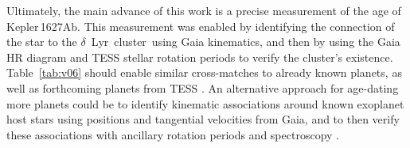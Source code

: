 \documentclass[12pt,modern,twocolumn,tighten]{aastex63}
\newcommand{\cn}{$\delta$\ Lyr\ cluster} %
\newcommand{\pn}{Kepler\,1627Ab} %
\begin{document}
Ultimately, the main advance of this work is a precise measurement of
the age of \pn.   This measurement was enabled by identifying the
connection of the star to the \cn\ using Gaia kinematics, and then by
using the Gaia HR diagram and TESS stellar rotation periods to verify the
cluster's existence.
Table~\ref{tab:v06} should enable similar cross-matches to already
known planets, as well as forthcoming planets from TESS
\citep{guerrero_tess_2021}.  An alternative
approach for age-dating more planets could be to identify kinematic
associations around known exoplanet host stars using positions and
tangential velocities from Gaia, and to then verify these associations
with ancillary rotation periods and spectroscopy \citep[{\it
e.g.},][]{tofflemire_tess_2021}.




\acknowledgements
\raggedbottom
\end{document}
